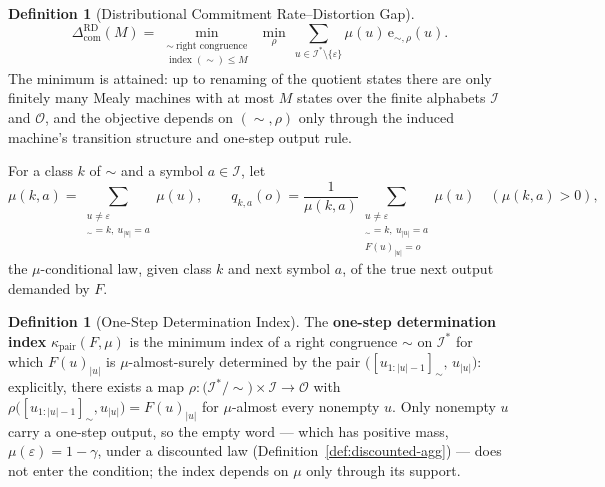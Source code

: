\documentclass[12pt]{article}
\theoremstyle{definition}
\newtheorem{definition}[theorem]{Definition}
\newcommand{\ComRD}{\Delta_{\mathrm{com}}^{\mathrm{RD}}}
\begin{document}
\begin{definition}[Distributional Commitment Rate--Distortion Gap]
\label{def:com-rd-gap}
\[
\ComRD(M)
=
\min_{\substack{\sim\ \text{right congruence}\\ \operatorname{index}(\sim)\le M}}
\ \min_{\rho}
\ \sum_{u\in\mathcal I^*\setminus\{\varepsilon\}}
\mu(u)\,
\mathrm e_{\sim,\rho}(u).
\]
The minimum is attained: up to renaming of the quotient states there are only
finitely many Mealy machines with at most $M$ states over the finite alphabets
$\mathcal I$ and $\mathcal O$, and the objective depends on $(\sim,\rho)$ only
through the induced machine's transition structure and one-step output rule.
\end{definition}

For a class $k$ of $\sim$ and a symbol $a\in\mathcal I$, let
\[
\mu(k,a)
=
\sum_{\substack{u\ne\varepsilon\\ [u_{1:|u|-1}]_\sim=k,\ u_{|u|}=a}}
\mu(u),
\qquad
q_{k,a}(o)
=
\frac1{\mu(k,a)}
\sum_{\substack{u\ne\varepsilon\\ [u_{1:|u|-1}]_\sim=k,\ u_{|u|}=a\\ F(u)_{|u|}=o}}
\mu(u)
\quad(\mu(k,a)>0),
\]
the $\mu$-conditional law, given class $k$ and next symbol $a$, of the true
next output demanded by $F$.

\begin{definition}[One-Step Determination Index]
\label{def:pair-determination-index}
The \textbf{one-step determination index} $\kappa_{\mathrm{pair}}(F,\mu)$ is
the minimum index of a right congruence $\sim$ on $\mathcal I^*$ for which
$F(u)_{|u|}$ is $\mu$-almost-surely determined by the pair
$\bigl([u_{1:|u|-1}]_\sim,\,u_{|u|}\bigr)$: explicitly, there exists a map
$\rho:\bigl(\mathcal I^*/\!\sim\bigr)\times\mathcal I\to\mathcal O$ with
$\rho\bigl([u_{1:|u|-1}]_\sim,u_{|u|}\bigr)=F(u)_{|u|}$ for $\mu$-almost
every nonempty $u$.  Only nonempty $u$ carry a one-step output, so the empty
word --- which has positive mass, $\mu(\varepsilon)=1-\gamma$, under a
discounted law (Definition~\ref{def:discounted-agg}) --- does not enter the
condition; the index depends on $\mu$ only through its support.
\end{definition}
\end{document}
